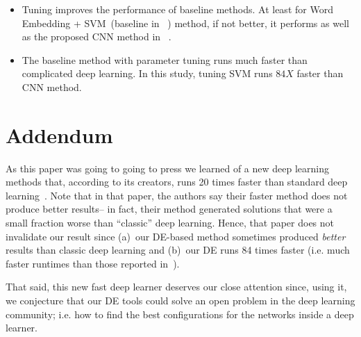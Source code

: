 \documentclass[sigconf]{acmart}
\theoremstyle{break}
\newcommand{\bi}{\begin{itemize}[leftmargin=0.4cm]}
\newcommand{\ei}{\end{itemize}}
\begin{document}
\bi
\item Tuning improves the performance of baseline methods. 
At least for Word Embedding + SVM~(baseline in ~\cite{xu2016predicting}) method, if not better,
it performs as well as the proposed CNN method in ~\cite{xu2016predicting}.
\item The baseline method with parameter tuning runs much faster than complicated deep learning.
In this study, tuning SVM runs $84X$ faster than CNN method.
\ei

\section{Addendum}
As this paper was going to going to press we learned of a new deep learning methods that, according to its
creators, runs 20 times faster than standard deep learning~\cite{spring2016scalable}. 
Note that in that paper, the authors say  their faster method does not produce better results-- 
in fact, their method generated solutions that were a small fraction worse than ``classic'' deep learning. Hence, that paper does not invalidate our result since (a)~our DE-based
method sometimes produced {\em better} results than classic deep learning and (b)~our DE runs 84 times faster (i.e. much faster runtimes than those reported in~\cite{spring2016scalable}).

That said, this new fast deep learner deserves our close attention since, using it, we conjecture that our DE tools
could solve an open problem in the deep learning community; i.e. how to find the best configurations for the networks inside a deep learner.

\end{document}
